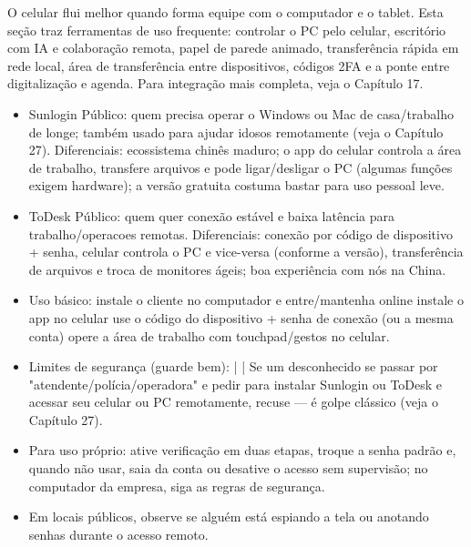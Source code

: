 
O celular flui melhor quando forma equipe com o computador e o tablet. Esta seção traz ferramentas de uso frequente: controlar o PC pelo celular, escritório com IA e colaboração remota, papel de parede animado, transferência rápida em rede local, área de transferência entre dispositivos, códigos 2FA e a ponte entre digitalização e agenda. Para integração mais completa, veja o Capítulo 17.


\begin{itemize}
  \item Sunlogin Público: quem precisa operar o Windows ou Mac de casa/trabalho de longe; também usado para ajudar idosos remotamente (veja o Capítulo 27). Diferenciais: ecossistema chinês maduro; o app do celular controla a área de trabalho, transfere arquivos e pode ligar/desligar o PC (algumas funções exigem hardware); a versão gratuita costuma bastar para uso pessoal leve.
  \item ToDesk Público: quem quer conexão estável e baixa latência para trabalho/operacoes remotas. Diferenciais: conexão por código de dispositivo + senha, celular controla o PC e vice-versa (conforme a versão), transferência de arquivos e troca de monitores ágeis; boa experiência com nós na China.
  \item Uso básico: instale o cliente no computador e entre/mantenha online instale o app no celular use o código do dispositivo + senha de conexão (ou a mesma conta) opere a área de trabalho com touchpad/gestos no celular.
  \item Limites de segurança (guarde bem): | | Se um desconhecido se passar por "atendente/polícia/operadora" e pedir para instalar Sunlogin ou ToDesk e acessar seu celular ou PC remotamente, recuse — é golpe clássico (veja o Capítulo 27).
  \item Para uso próprio: ative verificação em duas etapas, troque a senha padrão e, quando não usar, saia da conta ou desative o acesso sem supervisão; no computador da empresa, siga as regras de segurança.
  \item Em locais públicos, observe se alguém está espiando a tela ou anotando senhas durante o acesso remoto.
\end{itemize}


